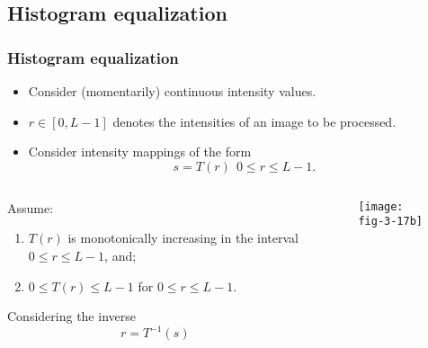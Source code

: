 
\subsection{Histogram equalization}


\begin{frame}
\frametitle{Histogram equalization}
\begin{itemize}
\item Consider (momentarily) continuous intensity values.
\item $r\in [0,L-1]$ denotes the intensities of an image to be processed.
\item Consider intensity mappings of the form
\begin{equation}
s=T(r)\ \ 0\leq r \leq L-1.
\end{equation}
\end{itemize}
\end{frame}


\begin{frame}
\begin{columns}
\begin{column}{.5\textwidth}
Assume:
\begin{enumerate}
\item $T(r)$ is monotonically increasing in the interval $0\leq r \leq L-1$, and;
\item $0\leq T(r) \leq L-1$ for $0\leq r \leq L-1$.
\end{enumerate}
Considering the inverse
\begin{equation}
r = T^{-1}(s)
\end{equation}
\end{column}
\begin{column}{.5\textwidth}
\begin{figure}
\centering
\texttt{[image: fig-3-17b]}
\end{figure}
\end{column}
\end{columns}
\end{frame}


